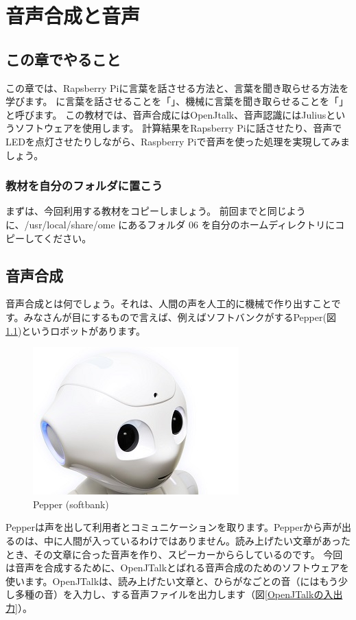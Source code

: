 \chapter{音声合成と音声}
\section{この章でやること}

この章では、Rapsberry Piに言葉を話させる方法と、言葉を聞き取らせる方法を学びます。
に言葉を話させることを「」、機械に言葉を聞き取らせることを「」と呼びます。
この教材では、音声合成にはOpenJtalk、音声認識にはJuliusというソフトウェアを使用します。
計算結果をRapsberry Piに話させたり、音声でLEDを点灯させたりしながら、Raspberry Piで音声を使った処理を実現してみましょう。

\subsection{教材を自分のフォルダに置こう}
まずは、今回利用する教材をコピーしましょう。
前回までと同じように、\nobreak/usr/local/share/ome にあるフォルダ 06 を自分のホームディレクトリにコピーしてください。

\newpage
\section{音声合成}
音声合成とは何でしょう。それは、人間の声を人工的に機械で作り出すことです。みなさんが目にするもので言えば、例えばソフトバンクがするPepper(図\ref{pepper})というロボットがあります。

\begin{figure}[H]
\begin{center}
    \includegraphics[width=.4\linewidth]{images/chap06/text06-img001.jpg}
    \caption{Pepper (softbank)}
    \label{pepper}
\end{center}
\end{figure}

Pepperは声を出して利用者とコミュニケーションを取ります。Pepperから声が出るのは、中に人間が入っているわけではありません。読み上げたい文章があったとき、その文章に合った音声を作り、スピーカーかららしているのです。
今回は音声を合成するために、OpenJTalkとばれる音声合成のためのソフトウェアを使います。OpenJTalkは、読み上げたい文章と、ひらがなごとの音（にはもう少し多種の音）を入力し、する音声ファイルを出力します（図\ref{OpenJTalkの入出力}）。

